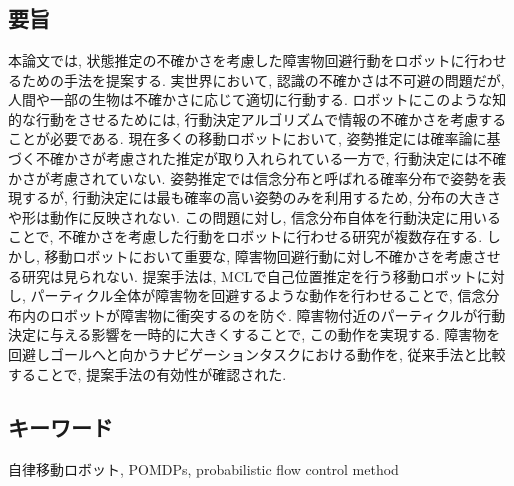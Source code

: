\chapter*{}

\section*{要旨}
本論文では, 状態推定の不確かさを考慮した障害物回避行動をロボットに行わせるための手法を提案する. 
実世界において, 認識の不確かさは不可避の問題だが, 人間や一部の生物は不確かさに応じて適切に行動する. 
ロボットにこのような知的な行動をさせるためには, 行動決定アルゴリズムで情報の不確かさを考慮することが必要である. 
現在多くの移動ロボットにおいて, 姿勢推定には確率論に基づく不確かさが考慮された推定が取り入れられている一方で, 行動決定には不確かさが考慮されていない. 
姿勢推定では信念分布と呼ばれる確率分布で姿勢を表現するが, 行動決定には最も確率の高い姿勢のみを利用するため, 分布の大きさや形は動作に反映されない. 
この問題に対し, 信念分布自体を行動決定に用いることで, 不確かさを考慮した行動をロボットに行わせる研究が複数存在する. 
しかし, 移動ロボットにおいて重要な, 障害物回避行動に対し不確かさを考慮させる研究は見られない. 
提案手法は, MCLで自己位置推定を行う移動ロボットに対し, パーティクル全体が障害物を回避するような動作を行わせることで, 信念分布内のロボットが障害物に衝突するのを防ぐ. 
障害物付近のパーティクルが行動決定に与える影響を一時的に大きくすることで, この動作を実現する. 
障害物を回避しゴールへと向かうナビゲーションタスクにおける動作を, 従来手法と比較することで, 提案手法の有効性が確認された. 

\section*{キーワード}
自律移動ロボット, POMDPs, probabilistic flow control method
